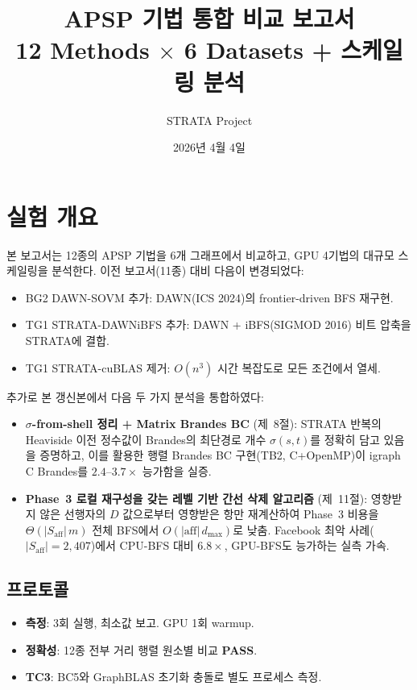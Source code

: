 \documentclass[11pt,a4paper]{article}
\title{\LARGE\textbf{APSP 기법 통합 비교 보고서} \\[0.5em]
  \large 12 Methods $\times$ 6 Datasets + 스케일링 분석}
\author{STRATA Project}
\date{2026년 4월 4일}
\begin{document}
\maketitle

\section{실험 개요}

본 보고서는 12종의 APSP 기법을 6개 그래프에서 비교하고, GPU 4기법의 대규모 스케일링을 분석한다. 이전 보고서(11종) 대비 다음이 변경되었다:
\begin{itemize}[leftmargin=1.4em]
  \item BG2 DAWN-SOVM 추가: DAWN(ICS 2024)의 frontier-driven BFS 재구현.
  \item TG1 STRATA-DAWNiBFS 추가: DAWN + iBFS(SIGMOD 2016) 비트 압축을 STRATA에 결합.
  \item TG1 STRATA-cuBLAS 제거: $O(n^3)$ 시간 복잡도로 모든 조건에서 열세.
\end{itemize}

추가로 본 갱신본에서 다음 두 가지 분석을 통합하였다:
\begin{itemize}[leftmargin=1.4em]
  \item \textbf{$\sigma$-from-shell 정리 + Matrix Brandes BC} (제~8절): STRATA 반복의 Heaviside 이전 정수값이 Brandes의 최단경로 개수 $\sigma(s,t)$를 정확히 담고 있음을 증명하고, 이를 활용한 행렬 Brandes BC 구현(TB2, C+OpenMP)이 igraph C Brandes를 $2.4$--$3.7\times$ 능가함을 실증.
  \item \textbf{Phase~3 로컬 재구성을 갖는 레벨 기반 간선 삭제 알고리즘} (제~11절): 영향받지 않은 선행자의 $D$ 값으로부터 영향받은 항만 재계산하여 Phase~3 비용을 $\Theta(|S_{\mathrm{aff}}|\,m)$ 전체 BFS에서 $O(|\mathrm{aff}|\,d_{\max})$로 낮춤. Facebook 최악 사례($|S_{\mathrm{aff}}|=2{,}407$)에서 CPU-BFS 대비 $6.8\times$, GPU-BFS도 능가하는 실측 가속.
\end{itemize}

\subsection{프로토콜}
\begin{itemize}[leftmargin=1.4em]
  \item \textbf{측정}: 3회 실행, 최소값 보고. GPU 1회 warmup.
  \item \textbf{정확성}: 12종 전부 거리 행렬 원소별 비교 \textbf{PASS}.
  \item \textbf{TC3}: BC5와 GraphBLAS 초기화 충돌로 별도 프로세스 측정.
\end{itemize}
\end{document}
